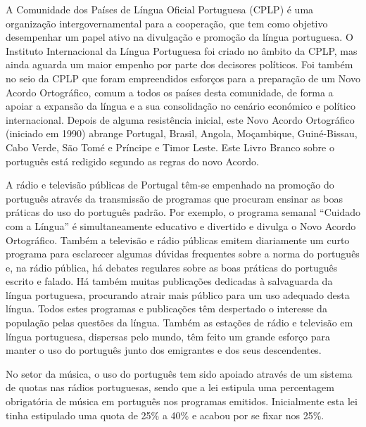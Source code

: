 \begin{multicols}{2}

A Comunidade dos Países de Língua Oficial Portuguesa (CPLP) é uma organização intergovernamental para a cooperação, que tem como objetivo desempenhar um papel ativo na divulgação e promoção da língua portuguesa. O Instituto Internacional da Língua Portuguesa foi criado no âmbito da CPLP, mas ainda aguarda um maior empenho por parte dos decisores políticos. Foi também no seio da CPLP que foram empreendidos esforços para a preparação de um Novo Acordo Ortográfico\cite{pinto}, comum a todos os países desta comunidade, de forma a apoiar a expansão da língua e a sua consolidação no cenário económico e político internacional. Depois de alguma resistência inicial, este Novo Acordo Ortográfico (iniciado em 1990) abrange Portugal, Brasil, Angola, Moçambique, Guiné-Bissau, Cabo Verde, São Tomé e Príncipe e Timor Leste. Este Livro Branco sobre o português está redigido segundo as regras do novo Acordo.

A rádio e televisão públicas de Portugal têm-se empenhado na promoção do português através da transmissão de programas que procuram ensinar as boas práticas do uso do português padrão. Por exemplo, o programa semanal “Cuidado com a Língua” é simultaneamente educativo e divertido e divulga o Novo Acordo Ortográfico. Também a televisão e rádio públicas emitem diariamente um curto programa para esclarecer algumas dúvidas frequentes sobre a norma do português e, na rádio pública, há debates regulares sobre as boas práticas do português escrito e falado. Há também muitas pu\-bli\-ca\-ções dedicadas à salvaguarda da língua portuguesa, procurando atrair mais público para um uso adequado desta língua. Todos estes programas e publicações têm despertado o interesse da população pelas questões da língua. Também as estações de rádio e televisão em língua portuguesa, dispersas pelo mundo, têm feito um grande esforço para manter o uso do português junto dos emigrantes e dos seus descendentes.


No setor da música, o uso do português tem sido apoiado através de um sistema de quotas nas rádios portuguesas, sendo que a lei estipula uma per\-cen\-ta\-gem obrigatória de música em português nos programas emitidos. Inicialmente esta lei tinha estipulado uma quota de 25\% a 40\% e acabou por se fixar nos 25\%. 


\end{multicols}
